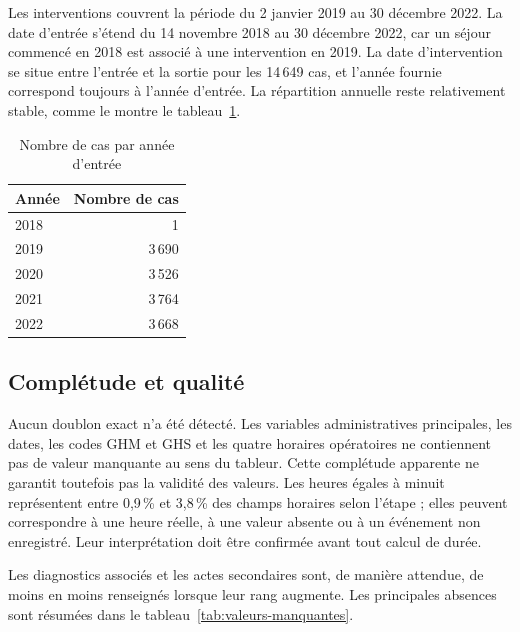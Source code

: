 Les interventions couvrent la période du 2 janvier 2019 au 30 décembre 2022. La date d'entrée s'étend du 14 novembre 2018 au 30 décembre 2022, car un séjour commencé en 2018 est associé à une intervention en 2019. La date d'intervention se situe entre l'entrée et la sortie pour les 14\,649 cas, et l'année fournie correspond toujours à l'année d'entrée. La répartition annuelle reste relativement stable, comme le montre le tableau~\ref{tab:repartition-annuelle}.

\begin{table}[htbp]
  \centering
  \caption{Nombre de cas par année d'entrée}
  \label{tab:repartition-annuelle}
  \begin{tabular}{@{}lr@{}}
    \toprule
    Année & Nombre de cas \\
    \midrule
    2018 & 1 \\
    2019 & 3\,690 \\
    2020 & 3\,526 \\
    2021 & 3\,764 \\
    2022 & 3\,668 \\
    \bottomrule
  \end{tabular}
\end{table}

\subsection{Complétude et qualité}

Aucun doublon exact n'a été détecté. Les variables administratives principales, les dates, les codes GHM et GHS et les quatre horaires opératoires ne contiennent pas de valeur manquante au sens du tableur. Cette complétude apparente ne garantit toutefois pas la validité des valeurs. Les heures égales à minuit représentent entre 0,9\,\% et 3,8\,\% des champs horaires selon l'étape ; elles peuvent correspondre à une heure réelle, à une valeur absente ou à un événement non enregistré. Leur interprétation doit être confirmée avant tout calcul de durée.

Les diagnostics associés et les actes secondaires sont, de manière attendue, de moins en moins renseignés lorsque leur rang augmente. Les principales absences sont résumées dans le tableau~\ref{tab:valeurs-manquantes}.


